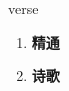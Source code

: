 
\begin{frame}
{\huge verse}
\begin{center}
\begin{enumerate}\Large
  \item \textbf{精通}
  \item \textbf{诗歌}
\end{enumerate}
\end{center}
\end{frame}
